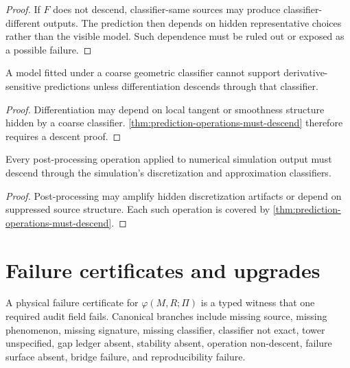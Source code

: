 \begin{proof}
If $F$ does not descend, classifier-same sources may produce classifier-different outputs. The prediction then depends on hidden representative choices rather than the visible model. Such dependence must be ruled out or exposed as a possible failure.
\end{proof}

\begin{corollary}
\label{cor:differentiation-audit-sensitive}
A model fitted under a coarse geometric classifier cannot support derivative-sensitive predictions unless differentiation descends through that classifier.
\end{corollary}

\begin{proof}
Differentiation may depend on local tangent or smoothness structure hidden by a coarse classifier. \autoref{thm:prediction-operations-must-descend} therefore requires a descent proof.
\end{proof}

\begin{corollary}
\label{cor:simulation-post-processing-descent}
Every post-processing operation applied to numerical simulation output must descend through the simulation's discretization and approximation classifiers.
\end{corollary}

\begin{proof}
Post-processing may amplify hidden discretization artifacts or depend on suppressed source structure. Each such operation is covered by \autoref{thm:prediction-operations-must-descend}.
\end{proof}

\section{Failure certificates and upgrades}
\label{sec:failure-certificates-upgrades}

\begin{definition}
\label{def:physical-failure-certificate-audit}
A physical failure certificate for $\varphi(M,R;\Pi)$ is a typed witness that one required audit field fails. Canonical branches include missing source, missing phenomenon, missing signature, missing classifier, classifier not exact, tower unspecified, gap ledger absent, stability absent, operation non-descent, failure surface absent, bridge failure, and reproducibility failure.
\end{definition}

